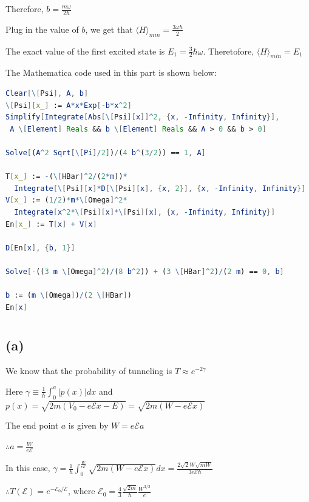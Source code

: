 \documentclass[12pt]{article}
\begin{document}
\begin{spacing}{2.0}
Therefore, $b=\frac{m \omega }{2 \hbar }$

Plug in the value of $b$, we get that $\langle H \rangle_{min}= \frac{3 \omega  \hbar }{2}$

The exact value of the first excited state is $E_1= \frac{3}{2} \hbar \omega$. Theretofore, $\langle H \rangle_{min}= E_1$

The Mathematica code used in this part is shown below:

\begin{lstlisting}[language=Mathematica,breaklines=true,frame=single]
Clear[\[Psi], A, b]
\[Psi][x_] := A*x*Exp[-b*x^2]
Simplify[Integrate[Abs[\[Psi][x]]^2, {x, -Infinity, Infinity}],
 A \[Element] Reals && b \[Element] Reals && A > 0 && b > 0]
 
Solve[(A^2 Sqrt[\[Pi]/2])/(4 b^(3/2)) == 1, A]

T[x_] := -(\[HBar]^2/(2*m))*
  Integrate[\[Psi][x]*D[\[Psi][x], {x, 2}], {x, -Infinity, Infinity}]
V[x_] := (1/2)*m*\[Omega]^2*
  Integrate[x^2*\[Psi][x]*\[Psi][x], {x, -Infinity, Infinity}]
En[x_] := T[x] + V[x]

D[En[x], {b, 1}]

Solve[-((3 m \[Omega]^2)/(8 b^2)) + (3 \[HBar]^2)/(2 m) == 0, b]

b := (m \[Omega])/(2 \[HBar])
En[x]
\end{lstlisting}

\section{} %

\subsection*{(a)}

We know that the probability of tunneling is $T\approx e^{-2\gamma}$

Here $\gamma \equiv \frac{1}{\hbar} \int_{0}^{a} |p(x)| dx$ and $p(x)= \sqrt{2m(V_0-e\mathcal{E}x-E)}= \sqrt{2m(W-e\mathcal{E}x)}$

The end point $a$ is given by $W=e\mathcal{E}a$

$\therefore a=\frac{W}{e\mathcal{E}}$

In this case, $\gamma= \frac{1}{\hbar} \int_{0}^{\frac{W}{e\mathcal{E}}} \sqrt{2m(W-e\mathcal{E}x)} dx = \frac{2 \sqrt{2} W \sqrt{m W}}{3 e \mathcal{E} \hbar}$

$\therefore T(\mathcal{E})= e^{-\mathcal{E}_0/\mathcal{E}}$, where $\mathcal{E}_0 = \frac{4}{3}\frac{\sqrt{2m}}{\hbar} \frac{W^{3/2}}{e}$


\end{spacing}
\end{document}
